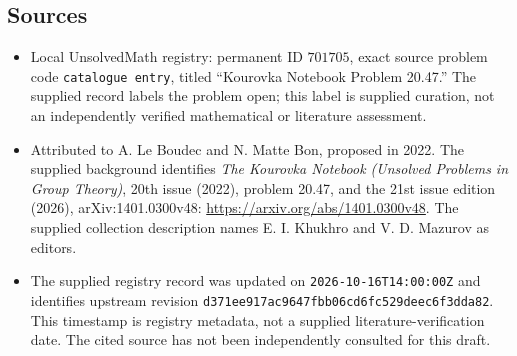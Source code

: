 \documentclass[11pt]{article}
\begin{document}
\subsection{Sources}
\begin{itemize}
\item Local UnsolvedMath registry: permanent ID \(701705\), exact source problem code \texttt{catalogue entry}, titled ``Kourovka Notebook Problem 20.47.'' The supplied record labels the problem open; this label is supplied curation, not an independently verified mathematical or literature assessment.
\item Attributed to A. Le Boudec and N. Matte Bon, proposed in 2022. The supplied background identifies \emph{The Kourovka Notebook (Unsolved Problems in Group Theory)}, 20th issue (2022), problem 20.47, and the 21st issue edition (2026), arXiv:1401.0300v48: \url{https://arxiv.org/abs/1401.0300v48}. The supplied collection description names E. I. Khukhro and V. D. Mazurov as editors.
\item The supplied registry record was updated on \texttt{2026-10-16T14:00:00Z} and identifies upstream revision \texttt{d371ee917ac9647fbb06cd6fc529deec6f3dda82}. This timestamp is registry metadata, not a supplied literature-verification date. The cited source has not been independently consulted for this draft.
\end{itemize}
\end{document}
